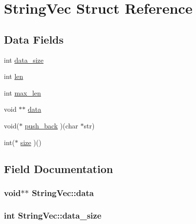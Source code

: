 \hypertarget{struct_string_vec}{}\section{String\+Vec Struct Reference}
\label{struct_string_vec}
\subsection*{Data Fields}
\begin{DoxyCompactItemize}
\item 
int \hyperlink{struct_string_vec_a4833997da46043501e6fbfafaa01dabf}{data\+\_\+size}
\item 
int \hyperlink{struct_string_vec_a7c24f16a046318d0be2902e0b40f07e4}{len}
\item 
int \hyperlink{struct_string_vec_a78df5c5f47656d385e2f6d1f2e9ed62b}{max\+\_\+len}
\item 
void $\ast$$\ast$ \hyperlink{struct_string_vec_a4ee18d189b50df8546029601ef1b76da}{data}
\item 
void($\ast$ \hyperlink{struct_string_vec_a8034d98a50a5e9d365f40cf93a80f625}{push\+\_\+back} )(char $\ast$str)
\item 
int($\ast$ \hyperlink{struct_string_vec_ab333b455c70e0234322232afe7b8ec24}{size} )()
\end{DoxyCompactItemize}


\subsection{Field Documentation}
\subsubsection[{\texorpdfstring{data}{data}}]{\setlength{\rightskip}{0pt plus 5cm}void$\ast$$\ast$ String\+Vec\+::data}\hypertarget{struct_string_vec_a4ee18d189b50df8546029601ef1b76da}{}\label{struct_string_vec_a4ee18d189b50df8546029601ef1b76da}
\subsubsection[{\texorpdfstring{data\+\_\+size}{data_size}}]{\setlength{\rightskip}{0pt plus 5cm}int String\+Vec\+::data\+\_\+size}\hypertarget{struct_string_vec_a4833997da46043501e6fbfafaa01dabf}{}\label{struct_string_vec_a4833997da46043501e6fbfafaa01dabf}

